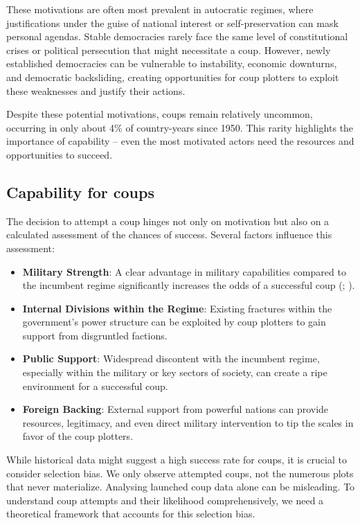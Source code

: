 \documentclass[
  12pt,
]{report}
\begin{document}
These motivations are often most prevalent in autocratic regimes, where
justifications under the guise of national interest or self-preservation
can mask personal agendas. Stable democracies rarely face the same level
of constitutional crises or political persecution that might necessitate
a coup. However, newly established democracies can be vulnerable to
instability, economic downturns, and democratic backsliding, creating
opportunities for coup plotters to exploit these weaknesses and justify
their actions.

Despite these potential motivations, coups remain relatively uncommon,
occurring in only about 4\% of country-years since 1950. This rarity
highlights the importance of capability -- even the most motivated
actors need the resources and opportunities to succeed.

\subsection{Capability for coups}\label{capability-for-coups}

The decision to attempt a coup hinges not only on motivation but also on
a calculated assessment of the chances of success. Several factors
influence this assessment:

\begin{itemize}
\item
  \textbf{Military Strength}: A clear advantage in military capabilities
  compared to the incumbent regime significantly increases the odds of a
  successful coup (;
  ).
\item
  \textbf{Internal Divisions within the Regime}: Existing fractures
  within the government's power structure can be exploited by coup
  plotters to gain support from disgruntled factions.
\item
  \textbf{Public Support}: Widespread discontent with the incumbent
  regime, especially within the military or key sectors of society, can
  create a ripe environment for a successful coup.
\item
  \textbf{Foreign Backing}: External support from powerful nations can
  provide resources, legitimacy, and even direct military intervention
  to tip the scales in favor of the coup plotters.
\end{itemize}

While historical data might suggest a high success rate for coups, it is
crucial to consider selection bias. We only observe attempted coups, not
the numerous plots that never materialize. Analysing launched coup data
alone can be misleading. To understand coup attempts and their
likelihood comprehensively, we need a theoretical framework that
accounts for this selection bias.
\end{document}
